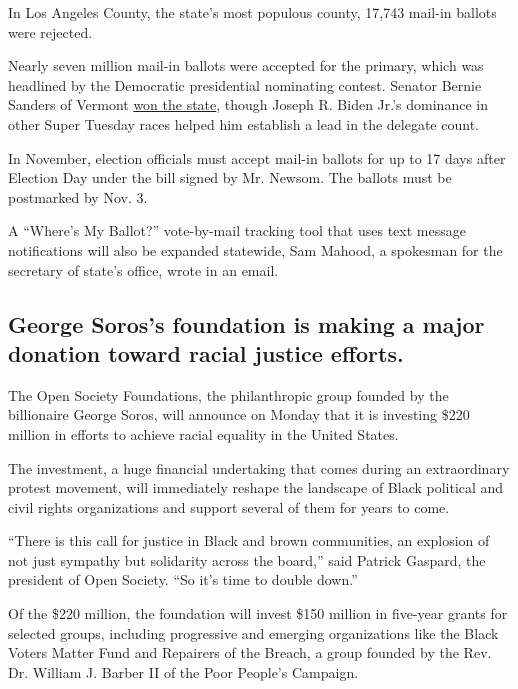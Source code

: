 In Los Angeles County, the state's most populous county, 17,743 mail-in
ballots were rejected.

Nearly seven million mail-in ballots were accepted for the primary,
which was headlined by the Democratic presidential nominating contest.
Senator Bernie Sanders of Vermont
\href{https://www.nytimes.com/interactive/2020/03/03/us/elections/results-california-president-democrat-primary-election.html}{won
the state}, though Joseph R. Biden Jr.'s dominance in other Super
Tuesday races helped him establish a lead in the delegate count.

In November, election officials must accept mail-in ballots for up to 17
days after Election Day under the bill signed by Mr. Newsom. The ballots
must be postmarked by Nov. 3.

A ``Where's My Ballot?'' vote-by-mail tracking tool that uses text
message notifications will also be expanded statewide, Sam Mahood, a
spokesman for the secretary of state's office, wrote in an email.

\hypertarget{george-soross-foundation-is-making-a-major-donation-toward-racial-justice-efforts}{%
\subsection{George Soros's foundation is making a major donation toward
racial justice
efforts.}\label{george-soross-foundation-is-making-a-major-donation-toward-racial-justice-efforts}}

The Open Society Foundations, the philanthropic group founded by the
billionaire George Soros, will announce on Monday that it is investing
\$220 million in efforts to achieve racial equality in the United
States.

The investment, a huge financial undertaking that comes during an
extraordinary protest movement, will immediately reshape the landscape
of Black political and civil rights organizations and support several of
them for years to come.

``There is this call for justice in Black and brown communities, an
explosion of not just sympathy but solidarity across the board,'' said
Patrick Gaspard, the president of Open Society. ``So it's time to double
down.''

Of the \$220 million, the foundation will invest \$150 million in
five-year grants for selected groups, including progressive and emerging
organizations like the Black Voters Matter Fund and Repairers of the
Breach, a group founded by the Rev. Dr. William J. Barber II of the Poor
People's Campaign.

